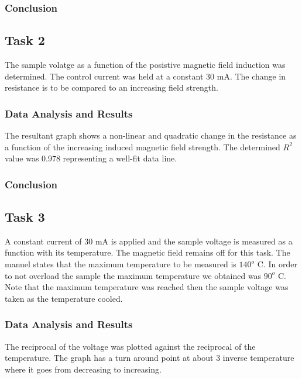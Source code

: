 \documentclass[a4paper]{article}
\begin{document}
\subsubsection{Conclusion}

\subsection{Task 2}

\qq The sample volatge as a function of the posistive magnetic field
induction was determined. The control current was held at a constant
30 mA. The change in resistance is to be compared to an increasing
field strength.

\subsubsection{Data Analysis and Results}
\qq The resultant graph shows a non-linear and quadratic change in the
resistance as a function of the increasing induced magnetic field
strength. The determined $R^2$ value was 0.978 representing a well-fit
data line.

\subsubsection{Conclusion}

\subsection{Task 3}

\qq A constant current of 30 mA is applied and the sample voltage is
measured as a function with its temperature. The magnetic field
remains off for this task. The manuel states that the maximum
temperature to be measured is $140^o$ C. In order to not overload the
sample the maximum temperature we obtained was $90^o$ C. Note that the
maximum temperature was reached then the sample voltage was taken as
the temperature cooled.

\subsubsection{Data Analysis and Results}
\qq The reciprocal of the voltage was plotted against the reciprocal
of the temperature. The graph has a turn around point at about 3
inverse temperature where it goes from decreasing to increasing.
\end{document}
